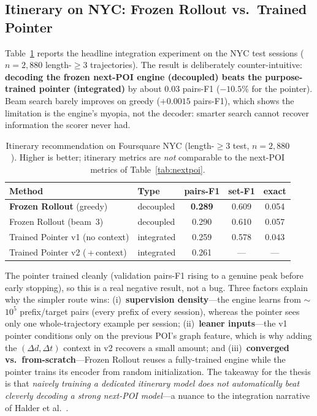 

\subsection{Itinerary on NYC: Frozen Rollout vs.\ Trained Pointer}
\label{sec:sol-results-nyc}

Table~\ref{tab:nyc-itin} reports the headline integration experiment on the NYC test sessions
($n=2{,}880$ length-$\ge\!3$ trajectories). The result is deliberately counter-intuitive:
\textbf{decoding the frozen next-POI engine (decoupled) beats the purpose-trained pointer
(integrated)} by about $0.03$ pairs-F1 ($-10.5\%$ for the pointer). Beam search barely improves
on greedy ($+0.0015$ pairs-F1), which shows the limitation is the engine's myopia, not the
decoder: smarter search cannot recover information the scorer never had.

\begin{table}[ht]
\centering
\caption{Itinerary recommendation on Foursquare NYC (length-$\ge\!3$ test, $n=2{,}880$). Higher
is better; itinerary metrics are \emph{not} comparable to the next-POI metrics of
Table~\ref{tab:nextpoi}.}
\label{tab:nyc-itin}
\begin{tabular}{llccc}
\toprule
Method & Type & pairs-F1 & set-F1 & exact \\
\midrule
\textbf{Frozen Rollout} (greedy) & decoupled & \textbf{0.289} & 0.609 & 0.054 \\
Frozen Rollout (beam~3) & decoupled & 0.290 & 0.610 & 0.057 \\
Trained Pointer v1 (no context) & integrated & 0.259 & 0.578 & 0.043 \\
Trained Pointer v2 (\,+\,context) & integrated & 0.261 & --- & --- \\
\bottomrule
\end{tabular}
\end{table}

The pointer trained cleanly (validation pairs-F1 rising to a genuine peak before early
stopping), so this is a real negative result, not a bug. Three factors explain why the simpler
route wins: (i)~\textbf{supervision density}---the engine learns from $\sim$$10^5$ prefix/target
pairs (every prefix of every session), whereas the pointer sees only one whole-trajectory
example per session; (ii)~\textbf{leaner inputs}---the v1 pointer conditions only on the
previous POI's graph feature, which is why adding the $(\Delta d,\Delta t)$ context in v2
recovers a small amount; and (iii)~\textbf{converged vs.\ from-scratch}---Frozen Rollout reuses
a fully-trained engine while the pointer trains its encoder from random initialization. The
takeaway for the thesis is that \emph{naively training a dedicated itinerary model does not
automatically beat cleverly decoding a strong next-POI model}---a nuance to the integration
narrative of Halder et al.~\cite{halder2025drlir}.

